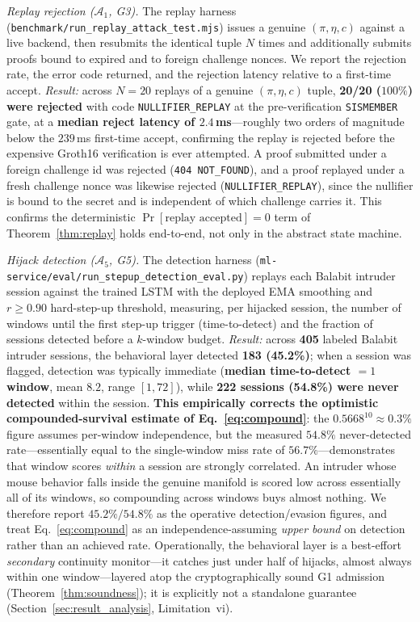 \documentclass[journal,twoside,10pt]{IEEEtran}
\begin{document}
\textit{Replay rejection ($\mathcal{A}_1$, G3).} The replay harness
(\texttt{benchmark/\allowbreak run\_replay\_\allowbreak attack\_test.mjs}) issues a genuine
$(\pi,\eta,c)$ against a live backend, then resubmits the identical tuple
$N$ times and additionally submits proofs bound to expired and to foreign
challenge nonces. We report the rejection rate, the error code returned,
and the rejection latency relative to a first-time accept.
\emph{Result:} across $N=20$ replays of a genuine
$(\pi,\eta,c)$ tuple, \textbf{20/20 ($100\%$) were rejected} with code
\texttt{NULLIFIER\_REPLAY} at the pre-verification \texttt{SISMEMBER}
gate, at a \textbf{median reject latency of $2.4$\,ms}---roughly two orders
of magnitude below the $239$\,ms first-time accept, confirming the replay
is rejected before the expensive Groth16 verification is ever attempted. A
proof submitted under a foreign challenge id was rejected (\texttt{404
NOT\_FOUND}), and a proof replayed under a fresh challenge nonce was
likewise rejected (\texttt{NULLIFIER\_REPLAY}), since the nullifier is
bound to the secret and is independent of which challenge carries it. This
confirms the deterministic $\Pr[\text{replay accepted}]=0$ term of
Theorem~\ref{thm:replay} holds end-to-end, not only in the abstract state
machine.

\textit{Hijack detection ($\mathcal{A}_5$, G5).} The detection harness
(\texttt{ml-service/\allowbreak eval/\allowbreak run\_stepup\_\allowbreak detection\_eval.py}) replays each
Balabit intruder session against the trained LSTM with the deployed EMA
smoothing and $r\ge0.90$ hard-step-up threshold, measuring, per hijacked
session, the number of windows until the first step-up trigger
(time-to-detect) and the fraction of sessions detected before a
$k$-window budget. \emph{Result:} across \textbf{405} labeled Balabit
intruder sessions, the behavioral layer detected \textbf{183 (45.2\%)};
when a session was flagged, detection was typically immediate
(\textbf{median time-to-detect $=1$ window}, mean $8.2$, range $[1,72]$),
while \textbf{222 sessions (54.8\%) were never detected} within the
session. \textbf{This empirically corrects the optimistic
compounded-survival estimate of Eq.~\ref{eq:compound}}: the
$0.5668^{10}\approx0.3\%$ figure assumes per-window independence, but the
measured $54.8\%$ never-detected rate---essentially equal to the
single-window miss rate of $56.7\%$---demonstrates that window scores
\emph{within} a session are strongly correlated. An intruder whose mouse
behavior falls inside the genuine manifold is scored low across
essentially all of its windows, so compounding across windows buys almost
nothing. We therefore report $45.2\%/54.8\%$ as the operative
detection/evasion figures, and treat Eq.~\ref{eq:compound} as an
independence-assuming \emph{upper bound} on detection rather than an
achieved rate. Operationally, the behavioral layer is a best-effort
\emph{secondary} continuity monitor---it catches just under half of
hijacks, almost always within one window---layered atop the
cryptographically sound G1 admission (Theorem~\ref{thm:soundness}); it is
explicitly not a standalone guarantee (Section~\ref{sec:result_analysis},
Limitation~vi).
\end{document}
